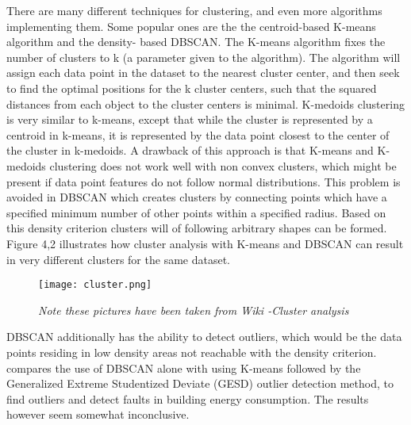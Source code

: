 There are many different techniques for clustering, and even more algorithms implementing them. Some popular ones are the the centroid-based K-means algorithm and the density- based DBSCAN. The K-means algorithm fixes the number of clusters to k (a parameter given to the algorithm). The algorithm will assign each data point in the dataset to the nearest cluster center, and then seek to find the optimal positions for the k cluster centers, such that the squared distances from each object to the cluster centers is minimal. K-medoids clustering is very similar to k-means, except that while the cluster is represented by a centroid in k-means, it is represented by the data point closest to the center of the cluster in k-medoids. A drawback of this approach is that K-means and K-medoids clustering does not work well with non convex clusters, which might be present if data point features do not follow normal distributions. This problem is avoided in DBSCAN which creates clusters by connecting points which have a specified minimum number of other points within a specified radius. Based on this density criterion clusters will of following arbitrary shapes can be formed. Figure 4,2 illustrates how cluster analysis with K-means and DBSCAN can result in very different clusters for the same dataset.
\begin{figure}
\begin{center}
\texttt{[image: cluster.png]}
\end{center}
\caption{\emph{Note these pictures have been taken from Wiki -Cluster analysis}}
\end{figure}
DBSCAN additionally has the ability to detect outliers, which would be the data points residing in low density areas not reachable with the density criterion. \cite{faultdetec3} compares the use of DBSCAN alone with using K-means followed by the Generalized Extreme Studentized Deviate (GESD) outlier detection method, to find  outliers and detect faults in building energy consumption. The results however seem somewhat inconclusive. 
\newline


